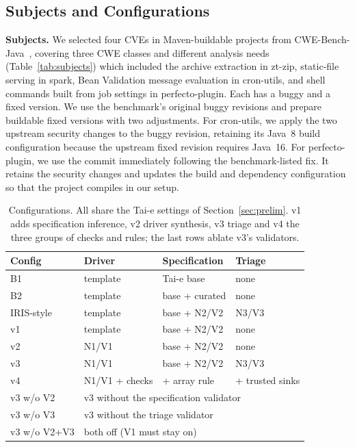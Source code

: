 \documentclass[sigconf]{acmart}
\begin{document}
\subsection{Subjects and Configurations}
\label{sec:setup}
\begin{table}[t]
\caption{Buggy subjects. LoC: non-blank Java lines; Jars: dependency jars; APIs: distinct external APIs called; Fix: methods changed by the patch; Tai-e: B1 analysis time.}
\label{tab:subjects}
\small\setlength{\tabcolsep}{3.2pt}

\end{table}

\textbf{Subjects.} We selected four CVEs in Maven-buildable projects from CWE-Bench-Java~\cite{li2025iris}, covering three CWE classes and different analysis needs (Table~\ref{tab:subjects}) which included the archive extraction in zt-zip, static-file serving in spark, Bean Validation message evaluation in cron-utils, and shell commands built from job settings in perfecto-plugin. Each has a buggy and a fixed version. We use the benchmark's original buggy revisions and prepare buildable fixed versions with two adjustments. For cron-utils, we apply the two upstream security changes to the buggy revision, retaining its Java~8 build configuration because the upstream fixed revision requires Java~16. For perfecto-plugin, we use the commit immediately following the benchmark-listed fix. It retains the security changes and updates the build and dependency configuration so that the project compiles in our setup.

\begin{table}[t]
\caption{Configurations. All share the Tai-e settings of Section~\ref{sec:prelim}. v1 adds specification inference, v2 driver synthesis, v3 triage and v4 the three groups of checks and rules; the last rows ablate v3's validators.}
\label{tab:configs}
\small\setlength{\tabcolsep}{3pt}
\begin{tabular}{@{}llll@{}}
\toprule
Config & Driver & Specification & Triage \\
\midrule
B1 & template & Tai-e base & none \\
B2 & template & base + curated & none \\
IRIS-style & template & base + N2/V2 & N3/V3 \\
\midrule
v1 & template & base + N2/V2 & none \\
v2 & N1/V1 & base + N2/V2 & none \\
v3 & N1/V1 & base + N2/V2 & N3/V3 \\
v4 & N1/V1 + checks & + array rule & + trusted sinks \\
\midrule
v3 w/o V2 & \multicolumn{3}{l}{v3 without the specification validator} \\
v3 w/o V3 & \multicolumn{3}{l}{v3 without the triage validator} \\
v3 w/o V2+V3 & \multicolumn{3}{l}{both off (V1 must stay on)} \\
\bottomrule
\end{tabular}
\end{table}
\end{document}
